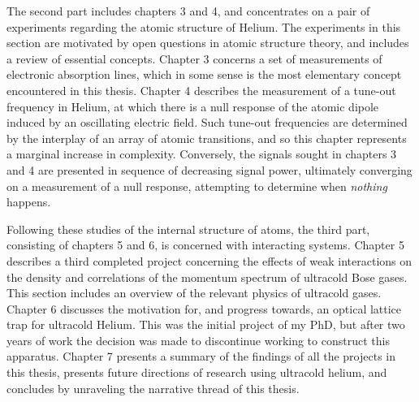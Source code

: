 The second part includes chapters 3 and 4, and concentrates on a pair of
experiments regarding the atomic structure of Helium. The experiments in
this section are motivated by open questions in atomic structure theory,
and includes a review of essential concepts. Chapter 3 concerns a set of
measurements of electronic absorption lines, which in some sense is the
most elementary concept encountered in this thesis. Chapter 4 describes
the measurement of a tune-out frequency in Helium, at which there is a
null response of the atomic dipole induced by an oscillating electric
field. Such tune-out frequencies are determined by the interplay of an
array of atomic transitions, and so this chapter represents a marginal
increase in complexity. Conversely, the signals sought in chapters 3 and
4 are presented in sequence of decreasing signal power, ultimately
converging on a measurement of a null response, attempting to determine
when \emph{nothing} happens.

Following these studies of the internal structure of atoms, the third
part, consisting of chapters 5 and 6, is concerned with interacting
systems. Chapter 5 describes a third completed project concerning the
effects of weak interactions on the density and correlations of the
momentum spectrum of ultracold Bose gases. This section includes an
overview of the relevant physics of ultracold gases. Chapter 6 discusses
the motivation for, and progress towards, an optical lattice trap for
ultracold Helium. This was the initial project of my PhD, but after two
years of work the decision was made to discontinue working to construct
this apparatus. Chapter 7 presents a summary of the findings of all the
projects in this thesis, presents future directions of research using
ultracold helium, and concludes by unraveling the narrative thread of
this thesis.





